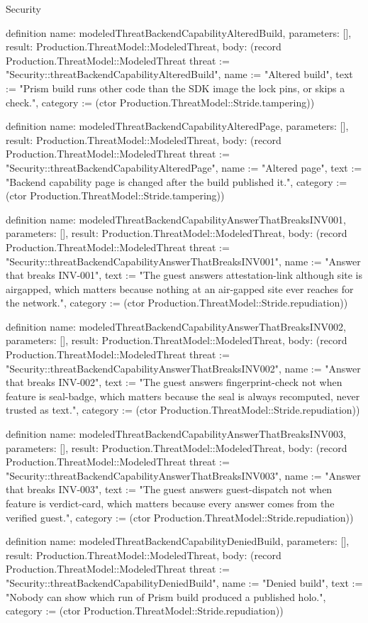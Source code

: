 \begin{lexlean}{Security}
\begin{semanticmodule}
definition{
  name: modeledThreatBackendCapabilityAlteredBuild,
  parameters: [],
  result: Production.ThreatModel::ModeledThreat,
  body: (record Production.ThreatModel::ModeledThreat {threat := "Security::threatBackendCapabilityAlteredBuild", name := "Altered build", text := "Prism build runs other code than the SDK image the lock pins, or skips a check.", category := (ctor Production.ThreatModel::Stride.tampering)})
}

definition{
  name: modeledThreatBackendCapabilityAlteredPage,
  parameters: [],
  result: Production.ThreatModel::ModeledThreat,
  body: (record Production.ThreatModel::ModeledThreat {threat := "Security::threatBackendCapabilityAlteredPage", name := "Altered page", text := "Backend capability page is changed after the build published it.", category := (ctor Production.ThreatModel::Stride.tampering)})
}

definition{
  name: modeledThreatBackendCapabilityAnswerThatBreaksINV001,
  parameters: [],
  result: Production.ThreatModel::ModeledThreat,
  body: (record Production.ThreatModel::ModeledThreat {threat := "Security::threatBackendCapabilityAnswerThatBreaksINV001", name := "Answer that breaks INV-001", text := "The guest answers attestation-link although site is airgapped, which matters because nothing at an air-gapped site ever reaches for the network.", category := (ctor Production.ThreatModel::Stride.repudiation)})
}

definition{
  name: modeledThreatBackendCapabilityAnswerThatBreaksINV002,
  parameters: [],
  result: Production.ThreatModel::ModeledThreat,
  body: (record Production.ThreatModel::ModeledThreat {threat := "Security::threatBackendCapabilityAnswerThatBreaksINV002", name := "Answer that breaks INV-002", text := "The guest answers fingerprint-check not when feature is seal-badge, which matters because the seal is always recomputed, never trusted as text.", category := (ctor Production.ThreatModel::Stride.repudiation)})
}

definition{
  name: modeledThreatBackendCapabilityAnswerThatBreaksINV003,
  parameters: [],
  result: Production.ThreatModel::ModeledThreat,
  body: (record Production.ThreatModel::ModeledThreat {threat := "Security::threatBackendCapabilityAnswerThatBreaksINV003", name := "Answer that breaks INV-003", text := "The guest answers guest-dispatch not when feature is verdict-card, which matters because every answer comes from the verified guest.", category := (ctor Production.ThreatModel::Stride.repudiation)})
}

definition{
  name: modeledThreatBackendCapabilityDeniedBuild,
  parameters: [],
  result: Production.ThreatModel::ModeledThreat,
  body: (record Production.ThreatModel::ModeledThreat {threat := "Security::threatBackendCapabilityDeniedBuild", name := "Denied build", text := "Nobody can show which run of Prism build produced a published holo.", category := (ctor Production.ThreatModel::Stride.repudiation)})
}


\end{semanticmodule}
\end{lexlean}
